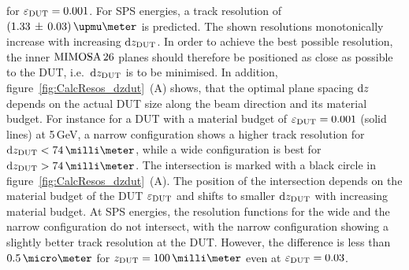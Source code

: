 \noindent
for $\mathnormal{\varepsilon_{\textrm{DUT}}} = 0.001$.
For SPS energies, a track resolution of $(1.33\,\pm\,0.03)\,\upmu\meter$ is predicted.
The shown resolutions monotonically increase with increasing $\textrm{d}z_{\textrm{DUT}}$. 
In order to achieve the best possible resolution, the inner $\textrm{MIMOSA\,26}$ planes should therefore be positioned as close as possible to the DUT, i.e.~$\textrm{d}z_{\textrm{DUT}}$ is to be minimised. 
In addition, figure~\ref{fig:CalcResos_dzdut}~(A) shows, that the optimal plane spacing $\textrm{d}z$ depends on the actual DUT size along the beam direction and its material budget.
For instance for a DUT with a material budget of $\mathnormal{\varepsilon_{\textrm{DUT}}} = 0.001$ (solid lines) at 5\,GeV, a narrow configuration shows a higher track resolution for $\dzdut < 74\,\milli\meter$,
 while a wide configuration is best for $\dzdut > 74\,\milli\meter$. %
The intersection is marked with a black circle in figure~\ref{fig:CalcResos_dzdut}~(A). 
The position of the intersection depends on the material budget of the DUT $\mathnormal{\varepsilon_{\textrm{DUT}}}$ and shifts to smaller $\textrm{d}z_{\textrm{DUT}}$ with increasing material budget. 
At SPS energies, the resolution functions for the wide and the narrow configuration do not intersect, with the narrow configuration showing a slightly better track resolution at the DUT. 
However, the difference is less than $0.5\,\micro\meter$ for $\zdut = 100\,\milli\meter$ even at $\mathnormal{\varepsilon_{\textrm{DUT}}} = 0.03$. 

% 
% 


